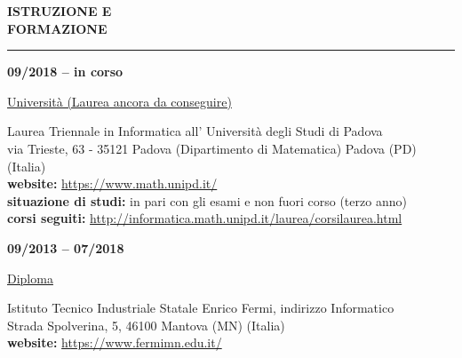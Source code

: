 \begin{minipage}[b]{0.3\textwidth}
	\textbf{ISTRUZIONE E \\FORMAZIONE}
\end{minipage}%
\hfill
\hfill
\begin{minipage}[t]{0.6\textwidth}		
	\rule{\textwidth}{0.4pt}
\end{minipage}%
\vspace{5mm}



\begin{minipage}[t]{0.3\textwidth}
	\textbf{09/2018 – in corso}
\end{minipage}%
\hfill
\hfill
\begin{minipage}[t]{0.6\textwidth}		
	\begin{Large}
		\underline{Università (Laurea ancora da conseguire)} \vspace{5mm}\\
	\end{Large}
	Laurea Triennale in Informatica all' Università degli Studi di Padova\\
	via Trieste, 63 - 35121 Padova (Dipartimento di Matematica) Padova (PD) (Italia) \\
	\textbf{website:} \url{https://www.math.unipd.it/}\\
	\textbf{situazione di studi:} in pari con gli esami e non fuori corso (terzo anno)\\
	\textbf{corsi seguiti:} \url{http://informatica.math.unipd.it/laurea/corsilaurea.html}\\
	\vspace{4mm}
\end{minipage}%


\begin{minipage}[t]{0.3\textwidth}
	\textbf{09/2013 – 07/2018}
\end{minipage}%
\hfill
\hfill
\begin{minipage}[t]{0.6\textwidth}		
	\begin{Large}
		\underline{Diploma} \vspace{5mm}\\
	\end{Large}
	Istituto Tecnico Industriale Statale Enrico Fermi, indirizzo Informatico\\
	Strada Spolverina, 5, 46100 Mantova (MN) (Italia) \\
	\textbf{website:} \url{https://www.fermimn.edu.it/} \vspace{1mm}\\
	\vspace{4mm}
\end{minipage}%